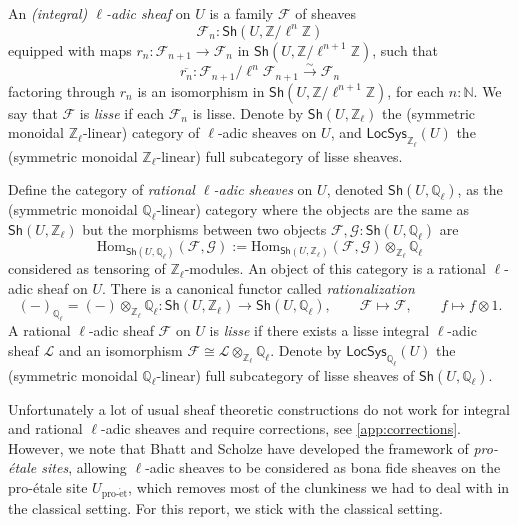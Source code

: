 \documentclass[11pt,letterpaper]{article}
\theoremstyle{numberfirstplain}
\numberwithin{equation}{theorem}
\theoremstyle{numberfirstupright}
\begin{document}
\begin{definition}
  An \textit{(integral) $\ell$-adic sheaf} on $U$ is a family $\mathcal F$ of sheaves $$\mathcal F_n:\mathsf{Sh}(U,\mathbb Z/\ell^n\mathbb Z)$$ equipped with maps $r_n:\mathcal F_{n+1}\rightarrow \mathcal F_n$ in $\mathsf{Sh}(U,\mathbb Z/\ell^{n+1}\mathbb Z)$, such that 
  $$\overline{r_n}:\mathcal F_{n+1}/\ell^n\mathcal F_{n+1}\xrightarrow{\sim}\mathcal F_n$$
  factoring through $r_n$ is an isomorphism in $\mathsf{Sh}(U,\mathbb Z/\ell^{n+1}\mathbb Z)$, for each $n:\mathbb N$. 
  We say that $\mathcal F$ is \textit{lisse} if each $\mathcal F_n$ is lisse. 
  Denote by $\mathsf{Sh}(U,\mathbb Z_\ell)$ the (symmetric monoidal $\mathbb Z_\ell$-linear) category of $\ell$-adic sheaves on $U$, and $\mathsf{LocSys}_{\mathbb Z_\ell}(U)$ the (symmetric monoidal $\mathbb Z_\ell$-linear) full subcategory of lisse sheaves. 
\end{definition}
\begin{definition}
  Define the category of \textit{rational $\ell$-adic sheaves} on $U$, denoted $\mathsf{Sh}(U,\mathbb Q_\ell)$, as the (symmetric monoidal $\mathbb Q_\ell$-linear) category where the objects are the same as $\mathsf{Sh}(U,\mathbb Z_\ell)$ but the morphisms between two objects $\mathcal F,\mathcal G:\mathsf{Sh}(U,\mathbb Q_\ell)$ are 
  $$\mathrm{Hom}_{\mathsf{Sh}(U,\mathbb Q_\ell)}(\mathcal F,\mathcal G):=\mathrm{Hom}_{\mathsf{Sh}(U,\mathbb Z_\ell)}(\mathcal F,\mathcal G)\otimes_{\mathbb Z_\ell}\mathbb Q_\ell$$
  considered as tensoring of $\mathbb Z_\ell$-modules. 
  An object of this category is a rational $\ell$-adic sheaf on $U$. There is a canonical functor called \textit{rationalization}
  $$(-)_{\mathbb Q_\ell}=(-)\otimes_{\mathbb Z_\ell}\mathbb Q_\ell:\mathsf{Sh}(U,\mathbb Z_\ell)\rightarrow \mathsf{Sh}(U,\mathbb Q_\ell),\qquad \mathcal F\mapsto\mathcal F,\qquad f\mapsto f\otimes 1.$$
  A rational $\ell$-adic sheaf $\mathcal F$ on $U$ is \textit{lisse} if there exists a lisse integral $\ell$-adic sheaf $\mathcal L$ and an isomorphism
  $\mathcal F\cong\mathcal L\otimes_{\mathbb Z_\ell}\mathbb Q_\ell.$ 
  Denote by $\mathsf{LocSys}_{\mathbb Q_\ell}(U)$ the (symmetric monoidal $\mathbb Q_\ell$-linear) full subcategory of lisse sheaves of $\mathsf{Sh}(U,\mathbb Q_\ell)$. 
\end{definition}

Unfortunately a lot of usual sheaf theoretic constructions do not work for integral and rational $\ell$-adic sheaves and require corrections, see \cref{app:corrections}. 
However, we note that Bhatt and Scholze \cite{BhattScholze2015} have developed the framework of \textit{pro-étale sites}, allowing $\ell$-adic sheaves to be considered as bona fide sheaves on the pro-étale site $U_{\mathrm{pro\text{-}\acute{e}t}}$, which removes most of the clunkiness we had to deal with in the classical setting. 
For this report, we stick with the classical setting. 
\end{document}
